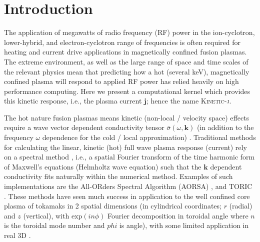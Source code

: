 \documentclass[final,5p,times,twocolumn]{elsarticle}
\renewcommand{\vec}[1]{\mathbf{#1}}
\newcommand{\kj}{\textsc{Kinetic-j}\xspace}
\begin{document}
\section{Introduction}
\label{section:introduction}
The application of megawatts of radio frequency (RF) power in the ion-cyclotron, lower-hybrid, and electron-cyclotron range of frequencies is often required for heating and current drive applications in magnetically confined fusion plasmas. The extreme environment, as well as the large range of space and time scales of the relevant physics mean that predicting how a hot (several keV), magnetically confined plasma will respond to applied RF power has relied heavily on high performance computing. Here we present a computational kernel which provides this kinetic response, i.e., the plasma current $\vec{j}$; hence the name \kj.  
%

The hot nature fusion plasmas means kinetic (non-local / velocity space) effects require a wave vector dependent conductivity tensor $\bar{\sigma}\left(\omega,\vec{k}\right)$ (in addition to the frequency $\omega$ dependence for the cold / local approximation) \cite[cf.,][]{stix,fukuyama1986}. Traditional methods for calculating the linear, kinetic (hot) full wave plasma response (current) rely on a spectral method \cite[e.g.,][]{brambilla1999,jaeger2001,jaeger2002a}, i.e., a spatial Fourier transform of the time harmonic form of Maxwell's equations (Helmholtz wave equation) such that the $\vec{k}$ dependent conductivity fits naturally within the numerical method. Examples of such implementations are the All-ORders Spectral Algorithm (AORSA) \cite{jaeger2003a}, and TORIC \cite{brambilla1999,wright2004}. These methods have seen much success in application to the well confined core plasma of tokamaks in 2 spatial dimensions (in cylindrical coordinates; $r$ (radial) and $z$ (vertical), with $\mathrm{exp}\left(in\phi\right)$ Fourier decomposition in toroidal angle where $n$ is the toroidal mode number and $phi$ is angle), with some limited application in real 3D \cite[c.f. Fig.~8 of][]{jaeger2002a}. 
\end{document}
